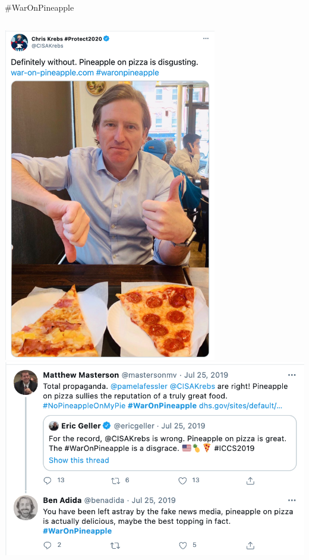 \documentclass[nobackground,dvipsnames,table,aspectratio=169]{beamer}
\begin{document}
\begin{frame}{\#WarOnPineapple}
    \centering
    \begin{columns}
            \centering
            \includegraphics[width=0.7\textwidth]{waronpineapple-1}
            \includegraphics[width=\textwidth]{waronpineapple-2}
    \end{columns}
\end{frame}
\end{document}
